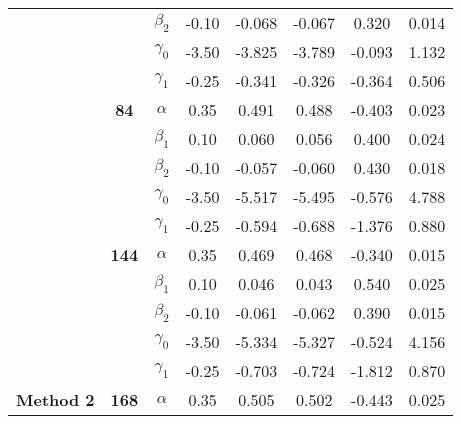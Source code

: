 \begin{table}[h]
\begin{tabular}[t]{>{}c>{}ccccccc}
 &  & $\beta_2$ & -0.10 & -0.068 & -0.067 & 0.320 & 0.014\\

 &  & $\gamma_0$ & -3.50 & -3.825 & -3.789 & -0.093 & 1.132\\

 &  & $\gamma_1$ & -0.25 & -0.341 & -0.326 & -0.364 & 0.506\\

 & \multirow{-5}{*}{\centering\arraybackslash \textbf{84}} & $\alpha$ & 0.35 & 0.491 & 0.488 & -0.403 & 0.023\\

 &  & $\beta_1$ & 0.10 & 0.060 & 0.056 & 0.400 & 0.024\\

 &  & $\beta_2$ & -0.10 & -0.057 & -0.060 & 0.430 & 0.018\\

 &  & $\gamma_0$ & -3.50 & -5.517 & -5.495 & -0.576 & 4.788\\

 &  & $\gamma_1$ & -0.25 & -0.594 & -0.688 & -1.376 & 0.880\\

 & \multirow{-5}{*}{\centering\arraybackslash \textbf{144}} & $\alpha$ & 0.35 & 0.469 & 0.468 & -0.340 & 0.015\\

 &  & $\beta_1$ & 0.10 & 0.046 & 0.043 & 0.540 & 0.025\\

 &  & $\beta_2$ & -0.10 & -0.061 & -0.062 & 0.390 & 0.015\\

 &  & $\gamma_0$ & -3.50 & -5.334 & -5.327 & -0.524 & 4.156\\

 &  & $\gamma_1$ & -0.25 & -0.703 & -0.724 & -1.812 & 0.870\\

\multirow{-15}{*}{\centering\arraybackslash \textbf{Method 2}} & \multirow{-5}{*}{\centering\arraybackslash \textbf{168}} & $\alpha$ & 0.35 & 0.505 & 0.502 & -0.443 & 0.025\\
\bottomrule
\end{tabular}
\end{table}
